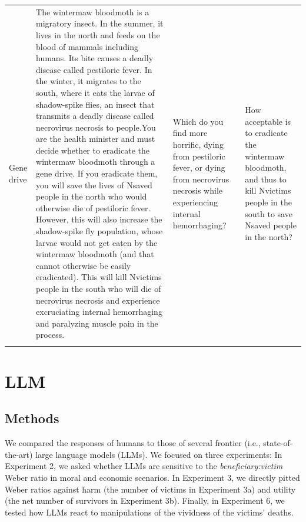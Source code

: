\documentclass[
]{article}
\begin{document}
\begin{landscape}
\begin{longtable}[t]{>{\raggedright\arraybackslash}p{2cm}>{\raggedright\arraybackslash}p{9.5cm}>{\raggedright\arraybackslash}p{3.5cm}>{\raggedright\arraybackslash}p{3.5cm}}
\hspace{1em}Gene drive & The wintermaw bloodmoth is a migratory insect. In the summer, it lives in the north and feeds on the blood of mammals including humans. Its bite causes a deadly disease called pestiloric fever. In the winter, it migrates to the south, where it eats the larvae of shadow-spike flies, an insect that transmits a deadly disease called necrovirus necrosis to people.You are the health minister and must decide whether to eradicate the wintermaw bloodmoth through a gene drive. If you eradicate them, you will save the lives of Nsaved people in the north who would otherwise die of pestiloric fever. However, this will also increase the shadow-spike fly population, whose larvae would not get eaten by the wintermaw bloodmoth (and that cannot otherwise be easily eradicated). This will kill Nvictims people in the south who will die of necrovirus necrosis and experience excruciating internal hemorrhaging and paralyzing muscle pain in the process. & Which do you find more horrific, dying from pestiloric fever, or dying from necrovirus necrosis while experiencing internal hemorrhaging? & How acceptable is to eradicate the wintermaw bloodmoth, and thus to kill Nvictims people in the south to save Nsaved people in the north?\\*
\end{longtable}
\endgroup{}
\end{landscape}

\clearpage

\section{LLM}\label{app:llm}

\subsection{Methods}\label{methods}

We compared the responses of humans to those of several frontier (i.e., state-of-the-art) large language models (LLMs). We focused on three experiments: In Experiment 2, we asked whether LLMs are sensitive to the \emph{beneficiary:victim} Weber ratio in moral and economic scenarios. In Experiment 3, we directly pitted Weber ratios against harm (the number of victims in Experiment 3a) and utility (the net number of survivors in Experiment 3b). Finally, in Experiment 6, we tested how LLMs react to manipulations of the vividness of the victims' deaths.
\end{document}
